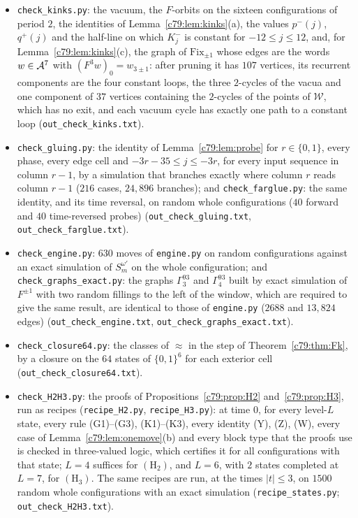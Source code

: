 \begin{itemize}
\item \texttt{check\_kinks.py}: the vacuum, the $F$-orbits on the sixteen configurations of period $2$, the identities of Lemma~\ref{c79:lem:kinks}(a), the values $p^-(j)$, $q^+(j)$ and the half-line on which $K^-_j$ is constant for $-12\le j\le12$, and, for Lemma~\ref{c79:lem:kinks}(c), the graph of $\mathrm{Fix}_{\pm1}$ whose edges are the words $w\in\mathcal{A}^7$ with $(F^3w)_0=w_{3\pm1}$: after pruning it has $107$ vertices, its recurrent components are the four constant loops, the three $2$-cycles of the vacua and one component of $37$ vertices containing the $2$-cycles of the points of $\mathcal W$, which has no exit, and each vacuum cycle has exactly one path to a constant loop (\texttt{out\_check\_kinks.txt}).
\item \texttt{check\_gluing.py}: the identity of Lemma~\ref{c79:lem:probe} for $r\in\{0,1\}$, every phase, every edge cell and $-3r-35\le j\le-3r$, for every input sequence in column $r-1$, by a simulation that branches exactly where column $r$ reads column $r-1$ ($216$ cases, $24{,}896$ branches); and \texttt{check\_farglue.py}: the same identity, and its time reversal, on random whole configurations ($40$ forward and $40$ time-reversed probes) (\texttt{out\_check\_gluing.txt}, \texttt{out\_check\_farglue.txt}).
\item \texttt{check\_engine.py}: $630$ moves of \texttt{engine.py} on random configurations against an exact simulation of $S^{\omega'}_m$ on the whole configuration; and \texttt{check\_graphs\_exact.py}: the graphs $\Gamma^{93}_3$ and $\Gamma^{93}_4$ built by exact simulation of $F^{\pm1}$ with two random fillings to the left of the window, which are required to give the same result, are identical to those of \texttt{engine.py} ($2688$ and $13{,}824$ edges) (\texttt{out\_check\_engine.txt}, \texttt{out\_check\_graphs\_exact.txt}).
\item \texttt{check\_closure64.py}: the classes of $\approx$ in the step of Theorem~\ref{c79:thm:Fk}, by a closure on the $64$ states of $\{0,1\}^6$ for each exterior cell (\texttt{out\_check\_closure64.txt}).
\item \texttt{check\_H2H3.py}: the proofs of Propositions~\ref{c79:prop:H2} and~\ref{c79:prop:H3}, run as recipes (\texttt{recipe\_H2.py}, \texttt{recipe\_H3.py}): at time $0$, for every level-$L$ state, every rule (G1)--(G3), (K1)--(K3), every identity (Y), (Z), (W), every case of Lemma~\ref{c79:lem:onemove}(b) and every block type that the proofs use is checked in three-valued logic, which certifies it for all configurations with that state; $L=4$ suffices for $(\mathrm H_2)$, and $L=6$, with $2$ states completed at $L=7$, for $(\mathrm H_3)$. The same recipes are run, at the times $|t|\le3$, on $1500$ random whole configurations with an exact simulation (\texttt{recipe\_states.py}; \texttt{out\_check\_H2H3.txt}).

\end{itemize}
